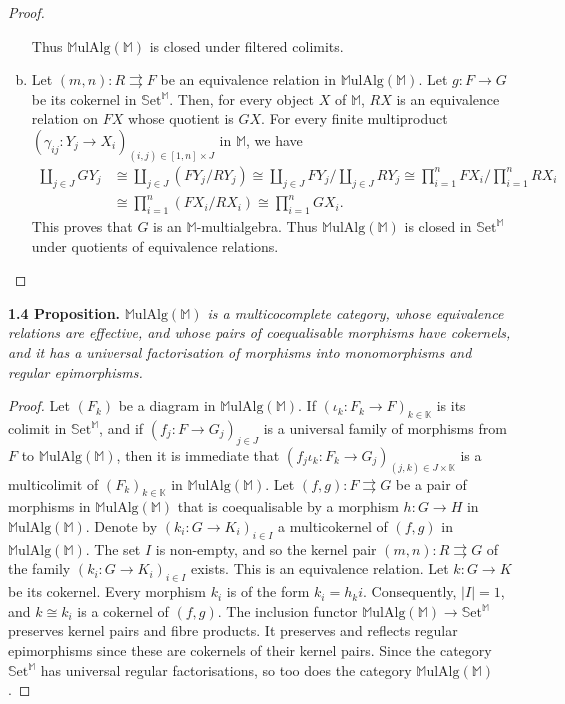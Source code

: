 \documentclass{article}
\newenvironment{itenv}[1]
  {\phantomsection\par\medskip\noindent\textbf{#1.}\itshape}
  {\medskip}
\newcommand{\bb}[1]{{\mathbb{#1}}}
\newcommand{\Set}{\mathbb{S}\mathrm{et}}
\newcommand{\MulAlg}{\mathbb{M}\mathrm{ulAlg}}
\newcommand{\oldpage}[1]{\marginpar{\footnotesize$\Big\vert$ \textit{p.~#1}}}
\begin{document}
\begin{proof}
\begin{enumerate}[a)]
      Thus $\MulAlg(\bb{M})$ is closed under filtered colimits.
    \item Let $(m,n)\colon R\rightrightarrows F$ be an equivalence relation in $\MulAlg(\bb{M})$.
      Let $g\colon F\to G$ be its cokernel in $\Set^\bb{M}$.
      Then, for every object $X$ of $\bb{M}$, $RX$ is an equivalence relation on $FX$ whose quotient is $GX$.
      For every finite multiproduct $(\gamma_{ij}\colon Y_j\to X_i)_{(i,j)\in[1,n]\times J}$ in $\bb{M}$, we have
      \[
        \begin{aligned}
          \coprod_{j\in J} GY_j
          &\cong \coprod_{j\in J} (FY_j/RY_j)
          \cong \coprod_{j\in J} FY_j \Big/ \coprod_{j\in J} RY_j
          \cong \prod_{i=1}^n FX_i \Big/ \prod_{i=1}^n RX_i
        \\&\cong \prod_{i=1}^n (FX_i/RX_i)
          \cong \prod_{i=1}^n GX_i.
        \end{aligned}
      \]
      This proves that $G$ is an $\bb{M}$-multialgebra.
      Thus $\MulAlg(\bb{M})$ is closed in $\Set^\bb{M}$ under quotients of equivalence relations.
  \end{enumerate}
\end{proof}

\oldpage{199}
\begin{itenv}{1.4 Proposition}
\label{1.4}
  $\MulAlg(\bb{M})$ is a multicocomplete category, whose equivalence relations are effective, and whose pairs of coequalisable morphisms have cokernels, and it has a universal factorisation of morphisms into monomorphisms and regular epimorphisms.
\end{itenv}

\begin{proof}
  Let $(F_k)$ be a diagram in $\MulAlg(\bb{M})$.
  If $(\iota_k\colon F_k\to F)_{k\in\bb{K}}$ is its colimit in $\Set^\bb{M}$, and if $(f_j\colon F\to G_j)_{j\in J}$ is a universal family of morphisms from $F$ to $\MulAlg(\bb{M})$, then it is immediate that $(f_j\iota_k\colon F_k\to G_j)_{(j,k)\in J\times\bb{K}}$ is a multicolimit of $(F_k)_{k\in\bb{K}}$ in $\MulAlg(\bb{M})$.
  Let $(f,g)\colon F\rightrightarrows G$ be a pair of morphisms in $\MulAlg(\bb{M})$ that is coequalisable by a morphism $h\colon G\to H$ in $\MulAlg(\bb{M})$.
  Denote by $(k_i\colon G\to K_i)_{i\in I}$ a multicokernel of $(f,g)$ in $\MulAlg(\bb{M})$.
  The set $I$ is non-empty, and so the kernel pair $(m,n)\colon R\rightrightarrows G$ of the family $(k_i\colon G\to K_i)_{i\in I}$ exists.
  This is an equivalence relation.
  Let $k\colon G\to K$ be its cokernel.
  Every morphism $k_i$ is of the form $k_i=h_ki$.
  Consequently, $|I|=1$, and $k\cong k_i$ is a cokernel of $(f,g)$.
  The inclusion functor $\MulAlg(\bb{M})\to\Set^\bb{M}$ preserves kernel pairs and fibre products.
  It preserves and reflects regular epimorphisms since these are cokernels of their kernel pairs.
  Since the category $\Set^\bb{M}$ has universal regular factorisations, so too does the category $\MulAlg(\bb{M})$.
\end{proof}
\end{document}

